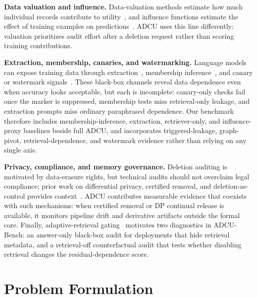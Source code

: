 \documentclass[10pt,journal,compsoc]{IEEEtran}
\newcommand{\method}{ADCU}
\newcommand{\bench}{ADCU-Bench}
\begin{document}
\textbf{Data valuation and influence.}
Data-valuation methods estimate how much individual records contribute to utility~\cite{ghorbani2019datashapley,jia2019data,kwon2021betashapley,wang2023databanzhaf}, and influence functions estimate the effect of training examples on predictions~\cite{koh2017influence,pruthi2020tracin,feldman2020memorization,ilyas2022datamodels}. \method{} uses this line differently: valuation prioritizes audit effort after a deletion request rather than scoring training contributions.

\textbf{Extraction, membership, canaries, and watermarking.}
Language models can expose training data through extraction~\cite{carlini2021extracting,carlini2019secretsharer,carlini2023quantifying}, membership inference~\cite{shokri2017membership,yeom2018privacy,mattern2023membership}, and canary or watermark signals~\cite{kirchenbauer2023watermark}. These black-box channels reveal data dependence even when accuracy looks acceptable, but each is incomplete: canary-only checks fail once the marker is suppressed, membership tests miss retrieval-only leakage, and extraction prompts miss ordinary paraphrased dependence. Our benchmark therefore includes membership-inference, extraction, retriever-only, and influence-proxy baselines beside full \method{}, and incorporates triggered-leakage, graph-pivot, retrieval-dependence, and watermark evidence rather than relying on any single axis.

\textbf{Privacy, compliance, and memory governance.}
Deletion auditing is motivated by data-erasure rights, but technical audits should not overclaim legal compliance; prior work on differential privacy, certified removal, and deletion-as-control provides context~\cite{dwork2006dp,voigt2017gdpr,guo2020certified}. \method{} contributes measurable evidence that coexists with such mechanisms: when certified removal or DP continual release is available, it monitors pipeline drift and derivative artifacts outside the formal core. Finally, adaptive-retrieval gating~\cite{wang2024ragate} motivates two diagnostics in \bench{}: an answer-only black-box audit for deployments that hide retrieval metadata, and a retrieval-off counterfactual audit that tests whether disabling retrieval changes the residual-dependence score.


\section{Problem Formulation}
\end{document}
